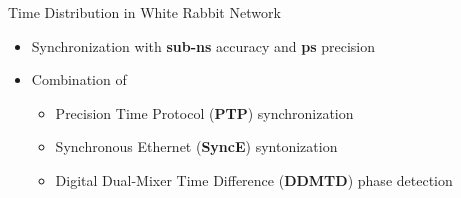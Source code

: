 \documentclass[compress,red]{beamer}
\begin{document}
\begin{frame}{Time Distribution in White Rabbit Network}

  \begin{itemize}
    \item Synchronization with {\bf sub-ns} accuracy and {\bf ps} precision
    \item Combination of
	\begin{itemize}
	  \item Precision Time Protocol ({\bf PTP}) synchronization
	  \item Synchronous Ethernet ({\bf SyncE}) syntonization
	  \item Digital Dual-Mixer Time Difference ({\bf DDMTD}) phase detection
	\end{itemize}
  \end{itemize}
\end{frame}
\end{document}
